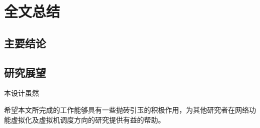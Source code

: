 \chapter{全文总结}
\label{chapter:conclusion}

\section{主要结论}

\section{研究展望}
本设计虽然

希望本文所完成的工作能够具有一些抛砖引玉的积极作用，为其他研究者在网络功能虚拟化及虚拟机调度方向的研究提供有益的帮助。
